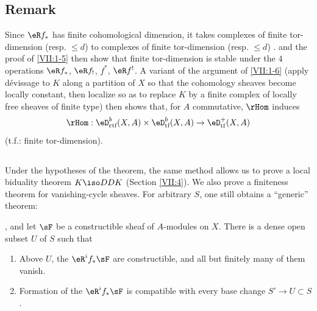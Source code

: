 \subsection{Remark}\label{VII:1-7}

Since $\eR f_\ast$ has finite cohomological dimension, it takes complexes of
finite tor-dimension (resp. $\leqslant d$) to complexes of finite
tor-dimension (resp. $\leqslant d$) \cite[XVII 5.2.11]{sga4}.
\cite[XVII 5.2.10]{sga4} and the proof of \ref{VII:1-5} then show that finite
tor-dimension is stable under the $4$ operations $\eR f_\ast$,
$\eR f_!$, $f^\ast$, $\eR f^!$. A variant of the argument of
\ref{VII:1-6} (apply dévissage to $K$ along a partition of $X$ so that the
cohomology sheaves become locally constant, then localize so as to replace $K$
by a finite complex of locally free sheaves of finite type) then shows that,
for $A$ commutative, $\rHom$ induces
\[
  \rHom:\eD_\text{ctf}^b(X,A)\times \eD_\text{tf}^b(X,A) \to \eD_\text{tf}^+(X,A)
\]
(t.f.: finite tor-dimension).






\subsection{}\label{VII:1-8}

Under the hypotheses of the theorem, the same method allows us to prove a
local biduality theorem $K\iso D D K$ (Section \ref{VII:4}). We also prove a
finiteness theorem for vanishing-cycle sheaves. For arbitrary $S$, one still
obtains a ``generic'' theorem:






\begin{theorem_}\label{VII:1-9}
, and let $\sF$ be
a constructible sheaf of $A$-modules on $X$. There is a dense open subset
$U$ of $S$ such that
\begin{enumerate}[\indent (i)]
  \item Above $U$, the $\eR^i f_\ast \sF$ are constructible, and all but
    finitely many of them vanish.
  \item Formation of the $\eR^i f_\ast \sF$ is compatible with every base
    change $S' \to U\subset S$.
\end{enumerate}
\end{theorem_}

